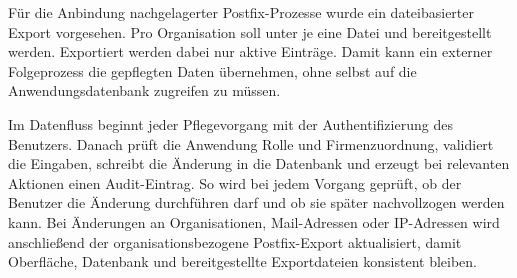 Für die Anbindung nachgelagerter Postfix-Prozesse wurde ein dateibasierter
Export vorgesehen. Pro Organisation soll unter 
je eine Datei  und 
bereitgestellt werden. Exportiert werden dabei nur aktive Einträge. Damit kann
ein externer Folgeprozess die gepflegten Daten übernehmen, ohne selbst
auf die Anwendungsdatenbank zugreifen zu müssen.

Im Datenfluss beginnt jeder Pflegevorgang mit der Authentifizierung des
Benutzers. Danach prüft die Anwendung Rolle und Firmenzuordnung,
validiert die Eingaben, schreibt die Änderung in die Datenbank und erzeugt bei
relevanten Aktionen einen Audit-Eintrag. So wird bei jedem Vorgang
geprüft, ob der Benutzer die Änderung durchführen darf und ob sie später
nachvollzogen werden kann.
Bei Änderungen an Organisationen, Mail-Adressen oder IP-Adressen wird
anschließend der organisationsbezogene Postfix-Export aktualisiert, damit
Oberfläche, Datenbank und bereitgestellte Exportdateien konsistent bleiben.
